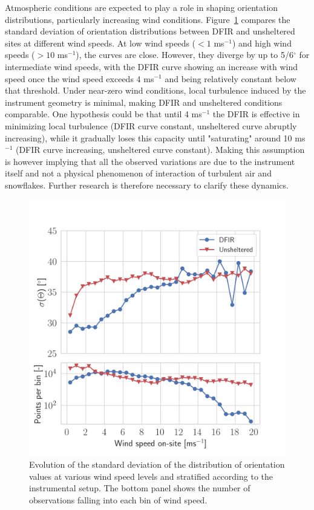 \documentclass[draft]{agujournal2019}
\begin{document}
Atmospheric conditions are expected to play a role in shaping orientation distributions, particularly increasing wind conditions. Figure~\ref{fig:wind-effect} compares the standard deviation of orientation distributions between DFIR and unsheltered sites at different wind speeds. At low wind speeds ($<1$ ms$^{-1}$) and high wind speeds ($>10$ ms$^{-1}$), the curves are close. However, they diverge by up to 5/6$^\circ$ for intermediate wind speeds, with the DFIR curve showing an increase with wind speed once the wind speed exceeds 4 ms$^{-1}$ and being relatively constant below that threshold. Under near-zero wind conditions, local turbulence induced by the instrument geometry is minimal, making DFIR and unsheltered conditions comparable. One hypothesis could be that until 4 ms$^{-1}$ the DFIR is effective in minimizing local turbulence (DFIR curve constant, unsheltered curve abruptly increasing), while it gradually loses this capacity until "saturating" around 10 ms$^{-1}$ (DFIR curve increasing, unsheltered curve constant). Making this assumption is however implying that all the observed variations are due to the instrument itself and not a physical phenomenon of interaction of turbulent air and snowflakes.  Further research is therefore necessary to clarify these dynamics.

\begin{figure}
 \noindent \centering \includegraphics[width=\textwidth]{Fig04.png}
\caption{Evolution of the standard deviation of the  distribution of orientation values at various wind speed levels and stratified according to the instrumental setup. The bottom panel shows the number of observations falling into each bin of wind speed.  }
\label{fig:wind-effect}
\end{figure}
\end{document}
